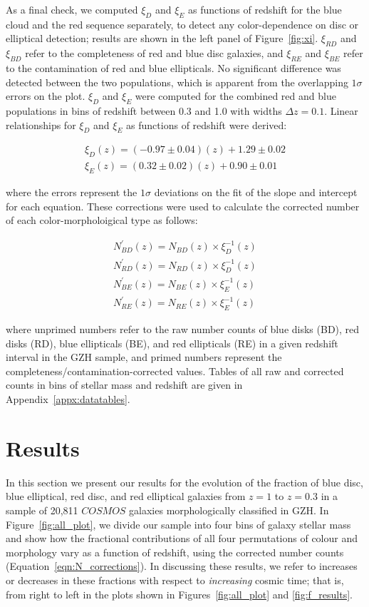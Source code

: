 \documentclass[useAMS,usenatbib]{mn2e}
\begin{document}
As a final check, we computed $\xi_D$ and $\xi_E$ as functions of redshift for the blue cloud and the red sequence separately, to detect any color-dependence on disc or elliptical detection; results are shown in the left panel of Figure~\ref{fig:xi}. $\xi_{RD}$ and $\xi_{BD}$ refer to the completeness of red and blue disc galaxies, and $\xi_{RE}$ and $\xi_{BE}$ refer to the contamination of red and blue ellipticals. No significant difference was detected between the two populations, which is apparent from the overlapping $1\sigma$ errors on the plot. $\xi_D$ and $\xi_E$ were computed for the combined red and blue populations in bins of redshift between 0.3 and 1.0 with widths $\Delta z = 0.1$. Linear relationships for $\xi_D$ and $\xi_E$ as functions of redshift were derived: 

\begin{align}
\xi_D(z) = (-0.97 \pm 0.04) (z) + 1.29 \pm 0.02 \nonumber \\
\xi_E(z) = (0.32 \pm 0.02) (z) + 0.90 \pm 0.01
\label{eqn:xis}
\end{align}
 
\noindent where the errors represent the $1\sigma$ deviations on the fit of the slope and intercept for each equation. These corrections were used to calculate the corrected number of each color-morpholoigical type as follows:

\begin{align}
N^{'}_{BD}(z) = N_{BD}(z) \times \xi_D^{-1}(z) \nonumber \\
N^{'}_{RD}(z) = N_{RD}(z) \times \xi_D^{-1}(z) \nonumber \\
N^{'}_{BE}(z) = N_{BE}(z) \times \xi_E^{-1}(z) \nonumber \\
N^{'}_{RE}(z) = N_{RE}(z) \times \xi_E^{-1}(z) 
\label{eqn:N_corrections}
\end{align}

\noindent where unprimed numbers refer to the raw number counts of blue disks (BD), red disks (RD), blue ellipticals (BE), and red ellipticals (RE) in a given redshift interval in the GZH sample, and primed numbers represent the completeness/contamination-corrected values. Tables of all raw and corrected counts in bins of stellar mass and redshift are given in Appendix~\ref{appx:datatables}. 

\section{Results}
\label{sec:results}
In this section we present our results for the evolution of the fraction of blue disc, blue elliptical, red disc, and red elliptical galaxies from $z=1$ to $z=0.3$ in a sample of 20,811 $COSMOS$ galaxies morphologically classified in GZH. In Figure~\ref{fig:all_plot}, we divide our sample into four bins of galaxy stellar mass and show how the fractional contributions of all four permutations of colour and morphology vary as a function of redshift, using the corrected number counts (Equation~\ref{eqn:N_corrections}). In discussing these results, we refer to increases or decreases in these fractions with respect to \emph{increasing} cosmic time; that is, from right to left in the plots shown in Figures~\ref{fig:all_plot} and \ref{fig:f_results}.
\end{document}
